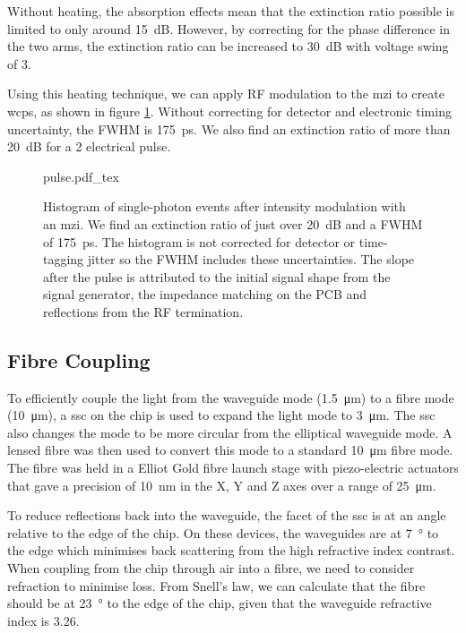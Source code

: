 Without heating, the absorption effects mean that the extinction ratio possible is limited to only around \SI{15}{dB}. However, by correcting for the phase difference in the two arms, the extinction ratio can be increased to \SI{30}{dB} with voltage swing of \SI{3}{\Vpp}. 

Using this heating technique, we can apply RF modulation to the \ac{mzi} to create \acp{wcp}, as shown in figure \ref{fig:pulses}. Without correcting for detector and electronic timing uncertainty, the \ac{FWHM} is \SI{175}{ps}. We also find an extinction ratio of more than \SI{20}{dB} for a \SI{2}{\Vpp} electrical pulse.

\begin{figure}[tp]
	\centering
	\small
	\def\svgwidth{0.8\textwidth} 
	{pulse.pdf_tex}
	\caption[On-chip intensity modulation of coherent states]{Histogram of single-photon events after intensity modulation with an \ac{mzi}. We find an extinction ratio of just over \SI{20}{dB} and a \ac{FWHM} of \SI{175}{\ps}. The histogram is not corrected for detector or time-tagging jitter so the \ac{FWHM} includes these uncertainties. The slope after the pulse is attributed to the initial signal shape from the signal generator, the impedance matching on the PCB and reflections from the RF termination.}
	\label{fig:pulses}
\end{figure}

\subsection{Fibre Coupling}

To efficiently couple the light from the waveguide mode (\SI{1.5}{\um}) to a fibre mode (\SI{10}{\micro\metre}), a \ac{ssc} on the chip is used to expand the light mode to \SI{3}{\micro\meter}. The \ac{ssc} also changes the mode to be more circular from the elliptical waveguide mode. A lensed fibre was then used to convert this mode to a standard \SI{10}{\micro\meter} fibre mode. The fibre was held in a Elliot Gold fibre launch stage with piezo-electric actuators that gave a precision of \SI{10}{\nm} in the X, Y and Z axes over a range of \SI{25}{\micro\meter}.

To reduce reflections back into the waveguide, the facet of the \ac{ssc} is at an angle relative to the edge of the chip. On these devices, the waveguides are at \SI{7}{\degree} to the edge which minimises back scattering from the high refractive index contrast. When coupling from the chip through air into a fibre, we need to consider refraction to minimise loss. From Snell's law, we can calculate that the fibre should be at \SI{23}{\degree} to the edge of the chip, given that the waveguide refractive index is 3.26.

